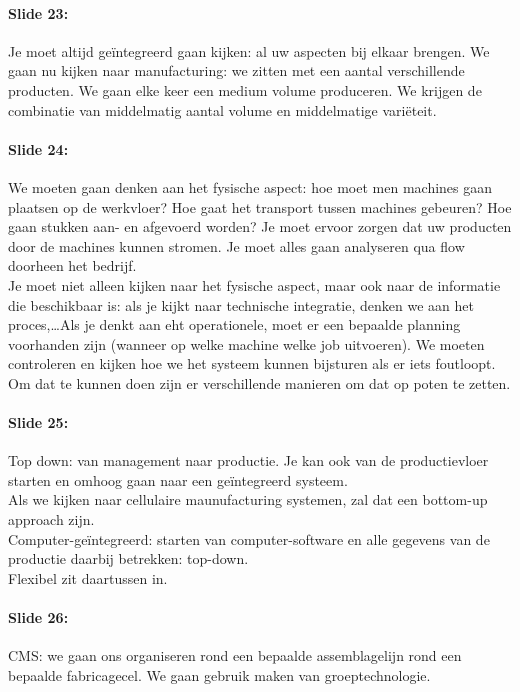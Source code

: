 \documentclass[10pt,a4paper]{report}
\begin{document}
\paragraph{Slide 23:} Je moet altijd ge\"integreerd gaan kijken: al uw aspecten bij elkaar brengen. We gaan nu kijken naar manufacturing: we zitten met een aantal verschillende producten. We gaan elke keer een medium volume produceren. We krijgen de combinatie van middelmatig aantal volume en middelmatige vari\"eteit.

\paragraph{Slide 24:} We moeten gaan denken aan het fysische aspect: hoe moet men machines gaan plaatsen op de werkvloer? Hoe gaat het transport tussen machines gebeuren? Hoe gaan stukken aan- en afgevoerd worden? Je moet ervoor zorgen dat uw producten door de machines kunnen stromen. Je moet alles gaan analyseren qua flow doorheen het bedrijf.\\
Je moet niet alleen kijken naar het fysische aspect, maar ook naar de informatie die beschikbaar is: als je kijkt naar technische integratie, denken we aan het proces,\ldots Als je denkt aan eht operationele, moet er een bepaalde planning voorhanden zijn (wanneer op welke machine welke job uitvoeren). We moeten controleren en kijken hoe we het systeem kunnen bijsturen als er iets foutloopt.\\
Om dat te kunnen doen zijn er verschillende manieren om dat op poten te zetten.

\paragraph{Slide 25:} Top down: van management naar productie. Je kan ook van de productievloer starten en omhoog gaan naar een ge\"integreerd systeem.\\
Als we kijken naar cellulaire maunufacturing systemen, zal dat een bottom-up approach zijn.\\
Computer-ge\"integreerd: starten van computer-software en alle gegevens van de productie daarbij betrekken: top-down.\\
Flexibel zit daartussen in.

\paragraph{Slide 26:} CMS: we gaan ons organiseren rond een bepaalde assemblagelijn rond een bepaalde fabricagecel. We gaan gebruik maken van groeptechnologie. 
\end{document}
